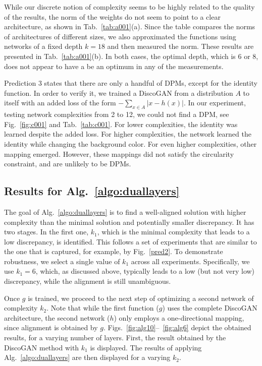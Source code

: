 \documentclass{article} %
\begin{document}
While our discrete notion of complexity seems to be highly related to the quality of the results, the norm of the weights do not seem to point to a clear architecture, as shown in Tab.~\ref{tab:a001}(a). Since the table compares the norms of architectures of different sizes, we also approximated the functions using networks of a fixed depth $k=18$ and then measured the norm. These results are presented in Tab.~\ref{tab:a001}(b). In both cases, the optimal depth, which is 6 or 8, does not appear to have a be an optimum in any of the measurements. 

Prediction 3 states that there are only a handful of DPMs,  except for the identity function. In order to verify it, we trained a DiscoGAN from a distribution $A$ to itself with an added loss of the form $-\sum_{x\in A}|x-h(x)|$. In our experiment, testing network complexities from 2 to 12, we could not find a DPM, see Fig.~\ref{fig:c001} and Tab.~\ref{tab:c001}. For lower complexities, the identity was learned despite the added loss. For higher complexities, the network learned the identity while changing the background color. For even higher complexities, other mapping emerged. However, these mappings did not satisfy the circularity constraint, and are unlikely to be DPMs.

\subsection{Results for Alg.~\ref{algo:duallayers}}

The goal of Alg.~\ref{algo:duallayers} is to find a well-aligned solution with higher complexity than the minimal solution and potentially smaller discrepancy. It has two stages. In the first one, $k_1$, which is the minimal complexity that leads to a low discrepancy, is identified. This follows a set of experiments that are similar to the one that is captured, for example, by Fig.~\ref{pred2}. To demonstrate robustness, we select a single value of $k_1$ across all experiments. Specifically, we use $k_1=6$, which, as discussed above, typically leads to a low (but not very low) discrepancy, while the alignment is still unambiguous. 

Once $g$ is trained, we proceed to the next step of optimizing a second network of complexity $k_2$. Note that while the first function ($g$) uses the complete DiscoGAN architecture, the second network ($h$) only employs a one-directional mapping, since alignment is obtained by $g$. Figs.~\ref{fig:alg10}--~\ref{fig:alg6} depict the obtained results, for a varying number of layers. First, the result obtained by the DiscoGAN method with $k_1$ is displayed. The results of applying Alg.~\ref{algo:duallayers} are then displayed for a varying $k_2$. 
\end{document}
